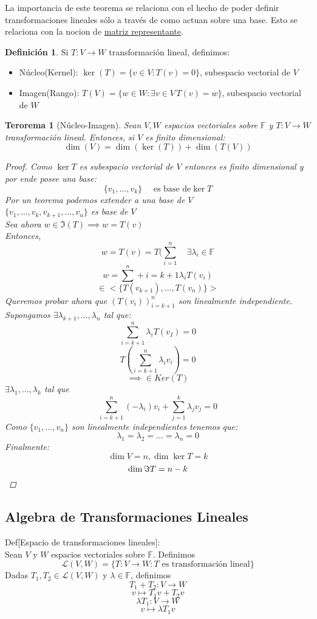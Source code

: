 \documentclass[11pt]{book}
\newtheorem{thm}{Terorema}[section]
\theoremstyle{definition}
\newtheorem{defn}{Definición}[section]
\begin{document}
La importancia de este teorema se relaciona con el hecho de poder definir transformaciones lineales sólo a través de como actuan sobre una base. Esto se relaciona con la nocion de \underline{matriz representante}.
\begin{defn}
Si $T:V\rightarrow W$ transformación lineal, definimos:
\begin{itemize}
	\item Núcleo(Kernel): $\ker(T)=\{v\in V:T(v)=0\}$, subespacio vectorial de $V$
	
	\item Imagen(Rango): $T(V)=\{w\in W:\exists v\in V\, T(v)=w\}$, subespacio vectorial de $W$
\end{itemize}
\end{defn}
\begin{thm}[Núcleo-Imagen]
Sean $V,W$ espacios vectoriales sobre $\mathbb{F}$ y $T:V\rightarrow W$ transformación lineal. Entonces, si $V$ es finito dimensional:
\[
\dim(V)=\dim(\ker(T))+\dim(T(V))
\]
\begin{proof}
Como $\ker T$ es subespacio vectorial de $V$ entonces es finito dimensional y por ende posee una base:
\[
\{v_1,...,v_k\} \quad\textrm{ es base de} \ker T
\]
Por un teorema podemos extender a una base de $V$\\
$\{v_1,...,v_k,v_{k+1},...,v_u\}$ es base de $V$\\
Sea ahora $w\in\Im(T)\implies w=T(v)$\\
Entonces,
\[
w=T(v)=T(\sum^n_{i=1}\quad\exists\lambda_i\in\mathbb{F}
\]
\[
w=\sum^n+{i=k+1}\lambda_iT(v_i)
\]
\[
\in<\{T(v_{k+1}),...,T(v_n)\}>
\]
Queremos probar ahora que $(T(v_i))^n_{i=k+1}$ son linealmente independiente. Supongamos $\exists\lambda_{k+1},...,\lambda_{n}$ tal que:
\[
\sum^n_{i=k+1}\lambda_iT(v_I)=0
\]
\[
T(\sum^n_{i=k+1}\lambda_iv_i)=0
\]
\[
\implies \in Ker(T)
\]
$\exists \lambda_1,...,\lambda_k$ tal que
\[
\sum^n_{i=k+1}(-\lambda_i)v_i+\sum^k_{j=1}\lambda_jv_j=0
\]
Como $\{v_1,...,v_n\}$ son linealmente independientes tenemos que:
\[
\lambda_1=\lambda_2=...=\lambda_n=0
\]
Finalmente:
\[
\dim V=n,\dim \ker T=k
\]
\[
\dim\Im T=n-k\qedhere
\]
\end{proof}
\end{thm}
\subsection{Algebra de Transformaciones Lineales}
Def[Espacio de transformaciones lineales]:\\
Sean $V$ y $W$ espacios vectoriales sobre $\mathbb{F}$. Definimos
\[
\mathcal{L}(V,W)=\{T:V\rightarrow W:T\textrm{ es transformación lineal}\}
\]
Dadas $T_1,T_2\in\mathcal{L}(V,W)$ y $\lambda\in\mathbb{F}$, definimos
\[
T_1+T_2:V\rightarrow W
\]
\[
v\mapsto T_1v+T_2v
\]
\[
\lambda T_1:V\rightarrow W
\]
\[
v\mapsto \lambda T_1v
\]
\end{document}
